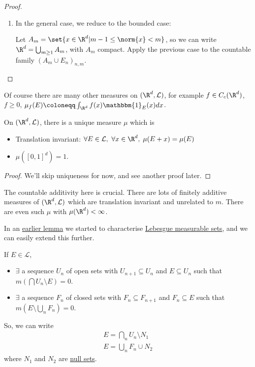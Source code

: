 \documentclass{article}
\newcommand{\1}[1]{\mathbbm{1}_{#1}}
\begin{document}
\begin{proof}
\begin{enumerate}[label=(\roman*)]
        \item In the general case, we reduce to the bounded case:

            Let $A_m = \set{x \in \R^d | m - 1 \leq \norm{x} < m}$, so we can write
            $\R^d = \bigcup_{m \geq 1} A_m$, with $A_m$ compact. Apply the previous case to the countable family $(A_m \cup E_n)_{n, m}$.
    \end{enumerate}
\end{proof}

\begin{remark}
    Of course there are many other measures on $(\R^d, \mathcal{L})$, for example $f \in C_c(\R^d)$, $f \geq 0$, $\mu_f(E) \coloneqq \int_{\R^d} f(x) \1{E}(x) dx$.
\end{remark}

\begin{prop}
    On $(\R^d, \mathcal{L})$, there is a unique measure $\mu$ which is
    \begin{itemize}
        \item Translation invariant: $\forall E \in \mathcal{L}, \ \forall x \in \R^d, \; \mu(E + x) = \mu(E)$
        \item $\mu([0, 1]^d) = 1$.
    \end{itemize}
\end{prop}

\begin{proof}
    We'll skip uniqueness for now, and see another proof later.
\end{proof}

\begin{remark}
    The countable additivity here is crucial. There are lots of finitely additive measures of $(\R^d, \mathcal{L})$ which are translation invariant and unrelated to $m$.  There are even such $\mu$ with $\mu(\R^d) < \infty$.
\end{remark}

In an \hyperlink{lem:lebChar}{earlier lemma} we started to characterise \hyperlink{def:lebMAble}{Lebesgue measurable sets}, and we can easily extend this further.

\begin{lemma}
    If $E \in \mathcal{L}$,
    \begin{itemize}
        \item $\exists$ a sequence $U_n$ of open sets with $U_{n+1} \subseteq U_n$ and $E \subseteq U_n$ such that $m(\bigcap U_n \setminus E) = 0$.
        \item $\exists$ a sequence $F_n$ of closed sets with $F_n \subseteq F_{n+1}$ and $F_n \subseteq E$ such that $m(E \setminus \bigcup_n F_n) = 0$.
    \end{itemize}
    So, we can write
    \begin{align*}
        E = \bigcap_n U_n \setminus N_1 \\
        E = \bigcup_n F_n \cup N_2
    \end{align*}
    where $N_1$ and $N_2$ are \hyperlink{def:null}{null sets}.
\end{lemma}
\end{document}
